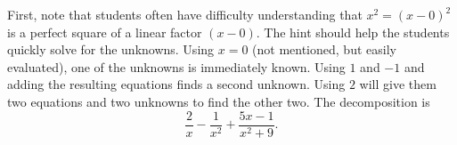\documentclass[handout]{ximera}
\begin{document}
\begin{instructorNotes}
First, note that students often have difficulty understanding that $x^2 = (x-0)^2$ is a perfect square of a linear factor $(x-0)$.  
The hint should help the students quickly solve for the unknowns.  
Using $x=0$ (not mentioned, but easily evaluated), one of the unknowns is immediately known.  
Using $1$ and $-1$ and adding the resulting equations finds a second unknown.  
Using $2$ will give them two equations and two unknowns to find the other two.  
The decomposition is
	\[
	\frac{2}{x} - \frac{1}{x^2} + \frac{5x-1}{x^2 + 9}.
	\]
\end{instructorNotes}
\end{document}
